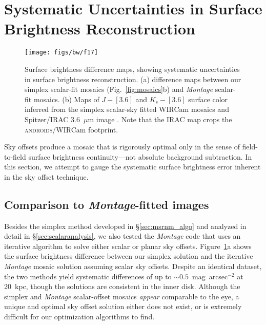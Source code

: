 \documentclass[iop,tighten]{emulateapj}
\newcommand{\sw}[1]{\textit{#1}} %
\newcommand{\androids}{\textsc{androids}}
\newcommand{\Fig}[1]{Fig.~\ref{fig:#1}}  %
\newcommand{\Sec}[1]{\S\ref{sec:#1}}  %
\begin{document}
\section{Systematic Uncertainties in Surface Brightness Reconstruction}
\label{sec:systematics}

\begin{figure}[t]
\centering
\texttt{[image: figs/bw/f17]}
\caption{Surface brightness difference maps, showing systematic uncertainties in surface brightness reconstruction. (a) difference maps between our simplex scalar-fit mosaics (\Fig{mosaics}b) and \sw{Montage} scalar-fit mosaics. (b) Maps of $J-[3.6]$ and $K_s-[3.6]$ surface color inferred from the simplex scalar-sky fitted WIRCam mosaics and Spitzer/IRAC 3.6~$\mu$m image \citep{Barmby:2006}.
Note that the IRAC map crops the \androids/WIRCam footprint.}
\label{fig:sbdiffs}
\end{figure}

Sky offsets produce a mosaic that is rigorously optimal only in the sense of field-to-field surface brightness continuity---not absolute background subtraction.
In this section, we attempt to gauge the systematic surface brightness error inherent in the sky offset technique.

\subsection{Comparison to \sw{Montage}-fitted images}


Besides the simplex method developed in \Sec{msrnm_algo} and analyzed in detail in \Sec{scalaranalysis}, we also tested the \sw{Montage} code that uses an iterative algorithm to solve either scalar or planar sky offsets.
Figure~\ref{fig:sbdiffs}a shows the surface brightness difference between our simplex solution and the iterative \sw{Montage} mosaic solution assuming scalar sky offsets.
Despite an identical dataset, the two methods yield systematic differences of up to $\sim 0.5$~mag~arcsec$^{-2}$ at 20~kpc, though the solutions are consistent in the inner disk.
Although the simplex and \sw{Montage} scalar-offset mosaics \emph{appear} comparable to the eye, a unique and optimal sky offset solution either does not exist, or is extremely difficult for our optimization algorithms to find.
\end{document}
